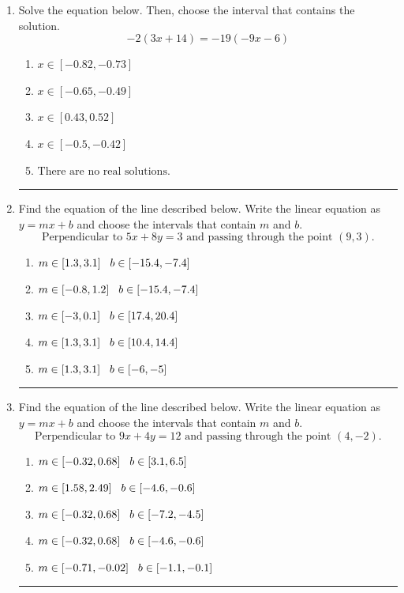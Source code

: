 \documentclass[14pt]{extbook}
\newcommand{\litem}[1]{\item#1\hspace*{-1cm}\rule{\textwidth}{0.4pt}}
\begin{document}
\begin{enumerate}
{\begin{enumerate}[label=\Alph*.]
\end{enumerate} }
\litem{
Solve the equation below. Then, choose the interval that contains the solution.\[ -2(3x + 14) = -19(-9x -6) \]\begin{enumerate}[label=\Alph*.]
\item \( x \in [-0.82, -0.73] \)
\item \( x \in [-0.65, -0.49] \)
\item \( x \in [0.43, 0.52] \)
\item \( x \in [-0.5, -0.42] \)
\item \( \text{There are no real solutions.} \)

\end{enumerate} }
\litem{
Find the equation of the line described below. Write the linear equation as $ y=mx+b $ and choose the intervals that contain $m$ and $b$.\[ \text{Perpendicular to } 5 x + 8 y = 3 \text{ and passing through the point } (9, 3). \]\begin{enumerate}[label=\Alph*.]
\item \( m \in [1.3, 3.1] \hspace*{3mm} b \in [-15.4, -7.4] \)
\item \( m \in [-0.8, 1.2] \hspace*{3mm} b \in [-15.4, -7.4] \)
\item \( m \in [-3, 0.1] \hspace*{3mm} b \in [17.4, 20.4] \)
\item \( m \in [1.3, 3.1] \hspace*{3mm} b \in [10.4, 14.4] \)
\item \( m \in [1.3, 3.1] \hspace*{3mm} b \in [-6, -5] \)

\end{enumerate} }
\litem{
Find the equation of the line described below. Write the linear equation as $ y=mx+b $ and choose the intervals that contain $m$ and $b$.\[ \text{Perpendicular to } 9 x + 4 y = 12 \text{ and passing through the point } (4, -2). \]\begin{enumerate}[label=\Alph*.]
\item \( m \in [-0.32, 0.68] \hspace*{3mm} b \in [3.1, 6.5] \)
\item \( m \in [1.58, 2.49] \hspace*{3mm} b \in [-4.6, -0.6] \)
\item \( m \in [-0.32, 0.68] \hspace*{3mm} b \in [-7.2, -4.5] \)
\item \( m \in [-0.32, 0.68] \hspace*{3mm} b \in [-4.6, -0.6] \)
\item \( m \in [-0.71, -0.02] \hspace*{3mm} b \in [-1.1, -0.1] \)


\end{enumerate}}
\end{enumerate}
\end{document}
